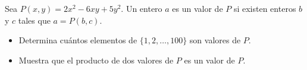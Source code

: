 Sea $P(x,y)=2x^2-6xy+5y^2$. Un entero $a$ es un valor de $P$ si existen enteros $b$ y $c$ tales que $a=P(b,c)$.
 \begin{itemize} 
 \item  Determina cuántos elementos de $\{1,2,\dots,100\}$ son valores de $P$.
 \item  Muestra que el producto de dos valores de $P$ es un valor de $P$.
 \end{itemize} 